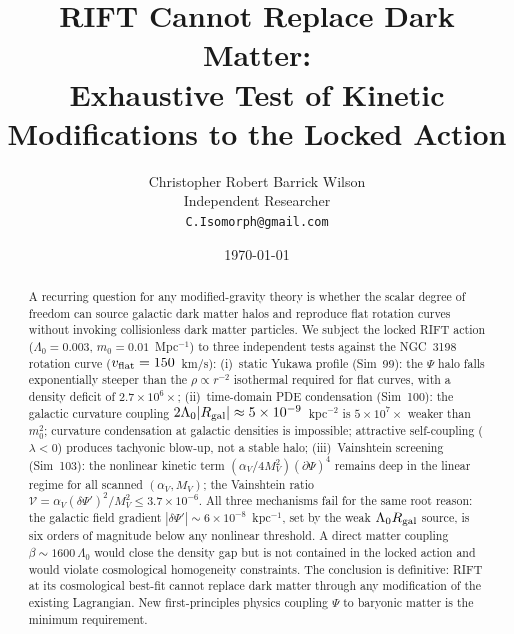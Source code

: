 \documentclass[12pt,a4paper]{article}
\begin{document}
\title{RIFT Cannot Replace Dark Matter:\\
Exhaustive Test of Kinetic Modifications to the Locked Action}

\author{Christopher Robert Barrick Wilson\\
\small Independent Researcher\\
\small \texttt{C.Isomorph@gmail.com}}
\date{\today}
\maketitle

\begin{abstract}
A recurring question for any modified-gravity theory is whether the
scalar degree of freedom can source galactic dark matter halos and
reproduce flat rotation curves without invoking collisionless dark matter
particles.  We subject the locked RIFT action
($\Lambda_0=0.003$, $m_0=0.01$~Mpc$^{-1}$) to three independent tests
against the NGC~3198 rotation curve ($v_{\rm flat}=150$~km/s):
(i)~static Yukawa profile (Sim~99): the $\Psi$ halo falls exponentially
    steeper than the $\rho\propto r^{-2}$ isothermal required for flat
    curves, with a density deficit of $2.7\times10^6\times$;
(ii)~time-domain PDE condensation (Sim~100): the galactic curvature
    coupling $2\Lambda_0|R_{\rm gal}|\approx5\times10^{-9}$~kpc$^{-2}$
    is $5\times10^7\times$ weaker than $m_0^2$; curvature condensation at
    galactic densities is impossible; attractive self-coupling
    ($\lambda<0$) produces tachyonic blow-up, not a stable halo;
(iii)~Vainshtein screening (Sim~103): the nonlinear kinetic term
    $(\alpha_V/4M_V^2)(\partial\Psi)^4$ remains deep in the linear
    regime for all scanned $(\alpha_V, M_V)$; the Vainshtein ratio
    $\mathcal{V}=\alpha_V(\delta\Psi')^2/M_V^2\leq3.7\times10^{-6}$.
All three mechanisms fail for the same root reason: the galactic field
gradient $|\delta\Psi'|\sim6\times10^{-8}$~kpc$^{-1}$, set by the weak
$\Lambda_0 R_{\rm gal}$ source, is six orders of magnitude below any
nonlinear threshold.  A direct matter coupling $\beta\sim1600\,\Lambda_0$
would close the density gap but is not contained in the locked action and
would violate cosmological homogeneity constraints.  The conclusion is
definitive: RIFT at its cosmological best-fit cannot replace dark matter
through any modification of the existing Lagrangian.  New first-principles
physics coupling $\Psi$ to baryonic matter is the minimum requirement.
\end{abstract}
\end{document}
